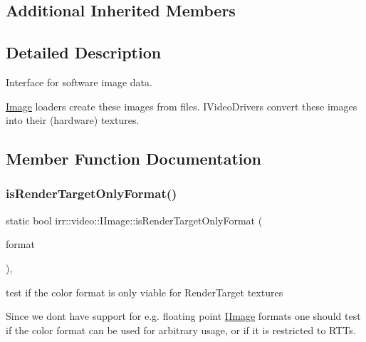 \subsection*{Additional Inherited Members}


\subsection{Detailed Description}
Interface for software image data. 

\hyperlink{classImage}{Image} loaders create these images from files. I\+Video\+Drivers convert these images into their (hardware) textures. 

\subsection{Member Function Documentation}
\mbox{\label{classirr_1_1video_1_1IImage_aafbd373ef15670708010e0064ae3b946}} 
\subsubsection{\texorpdfstring{is\+Render\+Target\+Only\+Format()}{isRenderTargetOnlyFormat()}}
{\footnotesize\ttfamily static bool irr\+::video\+::\+I\+Image\+::is\+Render\+Target\+Only\+Format (\begin{DoxyParamCaption}\item[{const \hyperlink{namespaceirr_1_1video_a1d5e487888c32b1674a8f75116d829ed}{E\+C\+O\+L\+O\+R\+\_\+\+F\+O\+R\+M\+AT}}]{format }\end{DoxyParamCaption})\hspace{0.3cm}{\ttfamily [inline]}, {\ttfamily [static]}}



test if the color format is only viable for Render\+Target textures 

Since we don\textquotesingle{}t have support for e.\+g. floating point \hyperlink{classirr_1_1video_1_1IImage}{I\+Image} formats one should test if the color format can be used for arbitrary usage, or if it is restricted to R\+T\+Ts. \mbox{\label{classirr_1_1video_1_1IImage_a5c4b0b5fa2a5f253f93c1b038e20d204}} 
